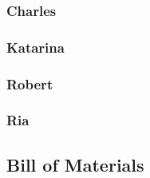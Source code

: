 \documentclass[12pt]{article}
\begin{document}
\begin{multicols*}{2}
            \subsubsection{Charles}

            \subsubsection{Katarina}

            \subsubsection{Robert}

            \subsubsection{Ria}

            
        \subsection{Bill of Materials}


\end{multicols*}
\end{document}
